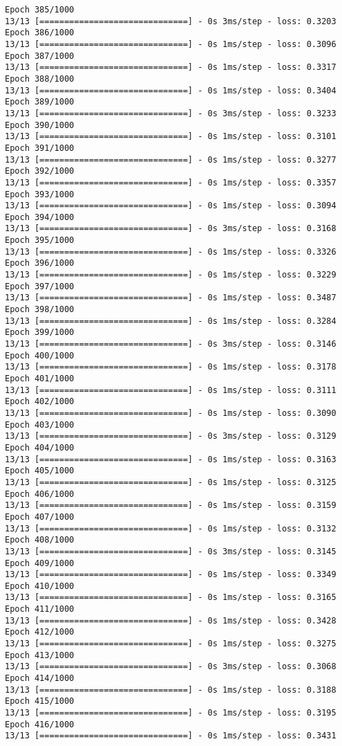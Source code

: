 \documentclass[11pt]{article}
\begin{document}
\begin{Verbatim}[commandchars=\\\{\}]
Epoch 385/1000
13/13 [==============================] - 0s 3ms/step - loss: 0.3203
Epoch 386/1000
13/13 [==============================] - 0s 1ms/step - loss: 0.3096
Epoch 387/1000
13/13 [==============================] - 0s 1ms/step - loss: 0.3317
Epoch 388/1000
13/13 [==============================] - 0s 1ms/step - loss: 0.3404
Epoch 389/1000
13/13 [==============================] - 0s 3ms/step - loss: 0.3233
Epoch 390/1000
13/13 [==============================] - 0s 1ms/step - loss: 0.3101
Epoch 391/1000
13/13 [==============================] - 0s 1ms/step - loss: 0.3277
Epoch 392/1000
13/13 [==============================] - 0s 1ms/step - loss: 0.3357
Epoch 393/1000
13/13 [==============================] - 0s 1ms/step - loss: 0.3094
Epoch 394/1000
13/13 [==============================] - 0s 3ms/step - loss: 0.3168
Epoch 395/1000
13/13 [==============================] - 0s 1ms/step - loss: 0.3326
Epoch 396/1000
13/13 [==============================] - 0s 1ms/step - loss: 0.3229
Epoch 397/1000
13/13 [==============================] - 0s 1ms/step - loss: 0.3487
Epoch 398/1000
13/13 [==============================] - 0s 1ms/step - loss: 0.3284
Epoch 399/1000
13/13 [==============================] - 0s 3ms/step - loss: 0.3146
Epoch 400/1000
13/13 [==============================] - 0s 1ms/step - loss: 0.3178
Epoch 401/1000
13/13 [==============================] - 0s 1ms/step - loss: 0.3111
Epoch 402/1000
13/13 [==============================] - 0s 1ms/step - loss: 0.3090
Epoch 403/1000
13/13 [==============================] - 0s 3ms/step - loss: 0.3129
Epoch 404/1000
13/13 [==============================] - 0s 1ms/step - loss: 0.3163
Epoch 405/1000
13/13 [==============================] - 0s 1ms/step - loss: 0.3125
Epoch 406/1000
13/13 [==============================] - 0s 1ms/step - loss: 0.3159
Epoch 407/1000
13/13 [==============================] - 0s 1ms/step - loss: 0.3132
Epoch 408/1000
13/13 [==============================] - 0s 3ms/step - loss: 0.3145
Epoch 409/1000
13/13 [==============================] - 0s 1ms/step - loss: 0.3349
Epoch 410/1000
13/13 [==============================] - 0s 1ms/step - loss: 0.3165
Epoch 411/1000
13/13 [==============================] - 0s 1ms/step - loss: 0.3428
Epoch 412/1000
13/13 [==============================] - 0s 1ms/step - loss: 0.3275
Epoch 413/1000
13/13 [==============================] - 0s 3ms/step - loss: 0.3068
Epoch 414/1000
13/13 [==============================] - 0s 1ms/step - loss: 0.3188
Epoch 415/1000
13/13 [==============================] - 0s 1ms/step - loss: 0.3195
Epoch 416/1000
13/13 [==============================] - 0s 1ms/step - loss: 0.3431

\end{Verbatim}
\end{document}
